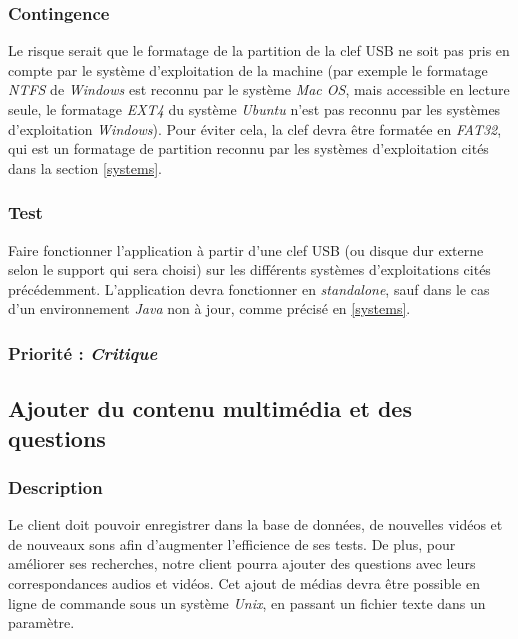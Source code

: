 \subsubsection{Contingence}

Le risque serait que le formatage de la partition de la clef USB ne soit pas pris en compte par le système d’exploitation de la machine (par exemple le formatage \textit{NTFS} de \textit{Windows} est reconnu par le système \textit{Mac OS}, mais accessible en lecture seule, le formatage \textit{EXT4} du système \textit{Ubuntu} n’est pas reconnu par les systèmes d’exploitation \textit{Windows}). Pour éviter cela, la clef devra être formatée en \textit{FAT32}, qui est un formatage de partition reconnu par les systèmes d’exploitation cités dans la section \ref{systems}.

\subsubsection{Test}

Faire fonctionner l’application à partir d’une clef USB (ou disque dur externe selon le support qui sera choisi) sur les différents systèmes d’exploitations cités précédemment. L'application devra fonctionner en \textit{standalone}, sauf dans le cas d'un environnement \textit{Java} non à jour, comme précisé en \ref{systems}.

\subsubsection{Priorité : \textit{Critique}}

\subsection{Ajouter du contenu multimédia et des questions}

\subsubsection{Description}

Le client doit pouvoir enregistrer dans la base de données, de nouvelles vidéos et de nouveaux sons afin d’augmenter l’efficience de ses tests. De plus, pour améliorer ses recherches, notre client pourra ajouter des questions avec leurs correspondances audios et vidéos.
Cet ajout de médias devra être possible en ligne de commande sous un système \textit{Unix}, en passant un fichier texte dans un paramètre.

